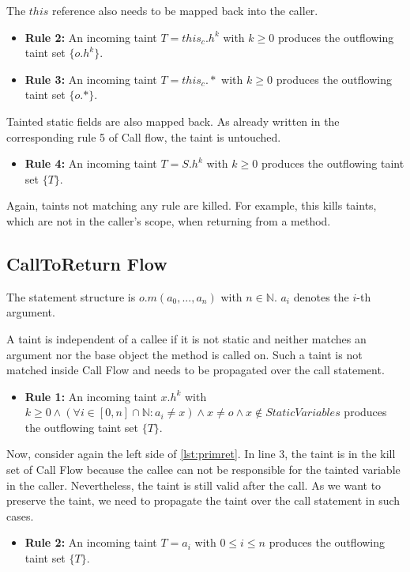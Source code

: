 \documentclass[../draft.tex]{subfiles}
\begin{document}
    The $\mathit{this}$ reference also needs to be mapped back into the caller.
    \begin{itemize}
        \item[] \textbf{Rule 2:} An incoming taint $T = \mathit{this}_c.h^k$ with $k \geq 0$ produces the outflowing taint set $\{o.h^k\}$.
        \item[] \textbf{Rule 3:} An incoming taint $T = \mathit{this}_c.*$ with $k \geq 0$ produces the outflowing taint set $\{o.*\}$.
    \end{itemize}

    Tainted static fields are also mapped back. As already written in the corresponding rule 5 of Call flow, the taint is untouched.
    \begin{itemize}
        \item[] \textbf{Rule 4:} An incoming taint $T = S.h^k$ with $k \geq 0$ produces the outflowing taint set $\{T\}$.
    \end{itemize}

    Again, taints not matching any rule are killed.
    For example, this kills taints, which are not in the caller's scope, when returning from a method.

    \subsection{CallToReturn Flow}
    The statement structure is $o.m(a_0, ..., a_n)$ with $n \in \mathbb{N}$.
    $a_i$ denotes the $i$-th argument.

    A taint is independent of a callee if it is not static and neither matches an argument nor the base object the method is called on.
    Such a taint is not matched inside Call Flow and needs to be propagated over the call statement.
    \begin{itemize}
        \item[] \textbf{Rule 1:} An incoming taint $x.h^k$ with $k \geq 0 \land \left(\forall i \in [0, n] \cap \mathbb{N}: a_i \neq x\right) \land x \neq o \land x \notin \mathit{StaticVariables}$ produces the outflowing taint set $\{T\}$.
    \end{itemize}

    Now, consider again the left side of \autoref{lst:primret}.
    In line 3, the  taint is in the kill set of Call Flow because the callee can not be responsible for the tainted variable in the caller.
    Nevertheless, the taint is still valid after the call.
    As we want to preserve the taint, we need to propagate the taint over the call statement in such cases.
    \begin{itemize}
        \item[] \textbf{Rule 2:} An incoming taint $T = a_i$ with $0 \leq i \leq n$ produces the outflowing taint set $\{T\}$.
    \end{itemize}
\end{document}
